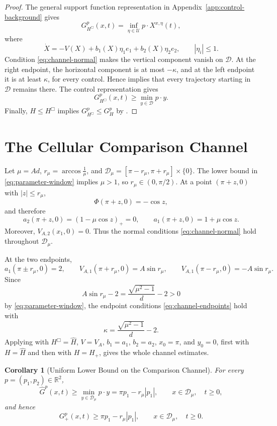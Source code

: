 \documentclass[11pt,reqno,noamsfonts]{amsart}
\newtheorem{corollary}[theorem]{Corollary}
\theoremstyle{definition}
\theoremstyle{remark}
\newcommand{\Hcut}{H_{+}}
\newcommand{\Hhat}{\widehat H}
\begin{document}
\begin{proof}
The general support function representation in
Appendix~\ref{app:control-background} gives
\[
  G_{H^{\Box}}^p(x,t)
  =\inf_{\eta\in\mathcal U}p\cdot X^{x,\eta}(t),
\]
where
\[
  \dot X=-V(X)+b_1(X)\eta_1e_1+b_2(X)\eta_2e_2,
  \qquad |\eta_i|\le1.
\]
Condition \eqref{eq:channel-normal} makes the vertical component vanish
on $\mathcal D$.  At the right endpoint, the horizontal component is at
most $-\kappa$, and at the left endpoint it is at least $\kappa$, for
every control.  Hence  implies
that every trajectory starting in $\mathcal D$ remains there.  The
control representation gives
\[
  G_{H^{\Box}}^p(x,t)
  \ge\min_{y\in\mathcal D}p\cdot y.
\]
Finally, $H\le H^{\Box}$ implies
$G_{H^{\Box}}^p\le G_H^p$ by
.
\end{proof}

\section{The Cellular Comparison Channel}\label{sec:trap}

Let
  $\mu=Ad$, 
  $r_\mu=\arccos\frac1\mu$, and   
  $\mathcal D_\mu=[\pi-r_\mu,\pi+r_\mu]\times\{0\}$. 
The lower bound in \eqref{eq:parameter-window} implies $\mu>1$, so
$r_\mu\in(0,\pi/2)$.  At a point $(\pi+z,0)$ with
$|z|\le r_\mu$,
\[
  \Phi(\pi+z,0)=-\cos z,
\]
and therefore
\[
  a_2(\pi+z,0)=(1-\mu\cos z)_+=0,
  \qquad
  a_1(\pi+z,0)=1+\mu\cos z.
\]
Moreover, $V_{A,2}(x_1,0)=0$.  Thus the normal conditions
\eqref{eq:channel-normal} hold throughout $\mathcal D_\mu$.

At the two endpoints,
\[
  a_1(\pi\pm r_\mu,0)=2,
  \qquad
  V_{A,1}(\pi+r_\mu,0)=A\sin r_\mu,
  \qquad
  V_{A,1}(\pi-r_\mu,0)=-A\sin r_\mu.
\]
Since
\[
  A\sin r_\mu-2
  =\frac{\sqrt{\mu^2-1}}d-2>0
\]
by \eqref{eq:parameter-window}, the endpoint conditions
\eqref{eq:channel-endpoints} hold with
\[
  \kappa=\frac{\sqrt{\mu^2-1}}d-2.
\]
Applying  with
$H^{\Box}=\Hhat$, $V=V_A$, $b_1=a_1$, $b_2=a_2$,
$x_0=\pi$, and $y_0=0$, first with $H=\Hhat$ and then with
$H=\Hcut$, gives the whole channel estimates.

\begin{corollary}[Uniform Lower Bound on the Comparison Channel]
\label{cor:stagnation}
For every $p=(p_1,p_2)\in\mathbb R^2$,
\[
  \widehat G^p(x,t)
  \ge\min_{y\in\mathcal D_\mu}p\cdot y
  =\pi p_1-r_\mu|p_1|,
  \qquad
  x\in\mathcal D_\mu,
  \quad t\ge0,
\]
and hence
\[
  G_+^p(x,t)
  \ge\pi p_1-r_\mu|p_1|,
  \qquad
  x\in\mathcal D_\mu,
  \quad t\ge0.
\]
\end{corollary}
\end{document}
